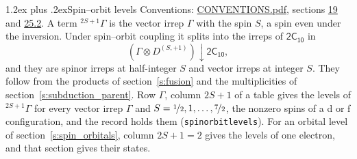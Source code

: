 \documentclass[10pt,a4paper]{article}
\makeatletter
\renewcommand\section{\@startsection{section}{1}{\z@}{-3ex plus -1ex minus -.2ex}%
  {1.2ex plus .2ex}{\normalfont\large\sffamily\bfseries\color{parttitle}}}
\numberwithin{equation}{section}
\newcommand{\grp}[1]{\mathsf{#1}}
\newcommand{\restr}[2]{#1\!\downarrow#2}
\newcommand{\irrJp}[2]{D^{(#1,#2)}}
\newcommand{\irrprod}{\otimes}
\newcommand{\term}[2]{{}^{#1}#2}
\makeatother
\begin{document}
\section{Spin--orbit levels}\label{s:spin_orbit}
Conventions: \href{../../CONVENTIONS.pdf}{CONVENTIONS.pdf}, sections \href{../../../rotation/CONVENTIONS.pdf\#conv.19}{19} and \href{../../CONVENTIONS.pdf\#conv.25.2}{25.2}.
\leavevmode\label{n:local.spin}\label{n:symbol.term}A term $\term{2S+1}{\Gamma}$ is the vector irrep $\Gamma$ with the spin $S$, a spin even under the inversion. Under spin--orbit coupling it splits into the irreps of $\grp{2C_{10}}$ in
\begin{equation}\label{e:spinorbit}\restr{(\Gamma \irrprod \irrJp{S}{+1})}{\grp{2C_{10}}},\end{equation}
and they are spinor irreps at half-integer $S$ and vector irreps at integer $S$. They follow from the products of section~\ref{s:fusion} and the multiplicities of section~\ref{s:subduction_parent}. Row $\Gamma$, column $2S + 1$ of a table gives the levels of $\term{2S+1}{\Gamma}$ for every vector irrep $\Gamma$ and $S = \nicefrac{1}{2}, 1, \dots, \nicefrac{7}{2}$, the nonzero spins of a d or f configuration, and the record holds them (\texttt{spinorbitlevels}). For an orbital level of section~\ref{s:spin_orbitals}, column $2S + 1 = 2$ gives the levels of one electron, and that section gives their states.
\end{document}
